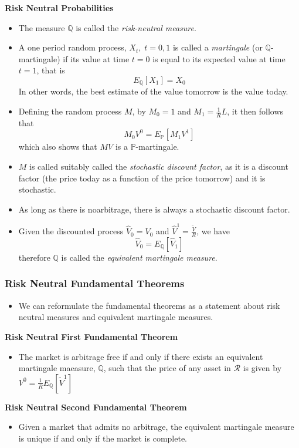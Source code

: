 \documentclass[11pt]{article}
\begin{document}
\textbf{Risk Neutral Probabilities}
\begin{itemize}
    \item The measure $\mathbb{Q}$ is called the \textit{risk-neutral measure}.
    \item A one period random process, $X_t, \; t=0,1$ is called a \textit{martingale} (or 
    $\mathbb{Q}$-martingale) if its value at time $t=0$ is equal to its expected value at time 
    $t=1$, that is
    \[E_{\mathbb{Q}}[X_1] = X_0\]
    In other words, the best estimate of the value tomorrow is the value today.
    \item Defining the random process $M$, by $M_0=1$ and $M_1=\frac{1}{R}L$, it then follows 
    that 
    \[M_0 V^0 = E_{\mathbb{P}}[M_1 V^1]\]
    which also shows that $MV$ is a $\mathbb{P}$-martingale.
    \item $M$ is called suitably called the \textit{stochastic discount factor}, as it is a 
    discount factor (the price today as a function of the price tomorrow) and it is stochastic.
    \item As long as there is noarbitrage, there is always a stochastic discount factor. 
    \item Given the discounted process $\hat{V}_0 = V_0$ and $\hat{V}^1 = \frac{\tilde{V}}{R}$,
    we have 
    \[\hat{V}_0 = E_{\mathbb{Q}}[\hat{V}_1]\]
    therefore $\mathbb{Q}$ is called the \textit{equivalent martingale measure}.
\end{itemize}

\subsubsection{Risk Neutral Fundamental Theorems}
\begin{itemize}
    \item We can reformulate the fundamental theorems as a statement about risk neutral
    measures and equivalent martingale measures.
\end{itemize}

\textbf{Risk Neutral First Fundamental Theorem}
\begin{itemize}
    \item The market is arbitrage free if and only if there exists an equivalent martingale 
    maeasure, $\mathbb{Q}$, such that the price of any asset in $\mathcal{R}$ is given by 
    $V^0 = \frac{1}{R}E_{\mathbb{Q}}[\tilde{V}^1]$
\end{itemize}

\textbf{Risk Neutral Second Fundamental Theorem}
\begin{itemize}
    \item Given a market that admits no arbitrage, the equivalent martingale measure is unique 
    if and only if the market is complete.
\end{itemize}
\end{document}
